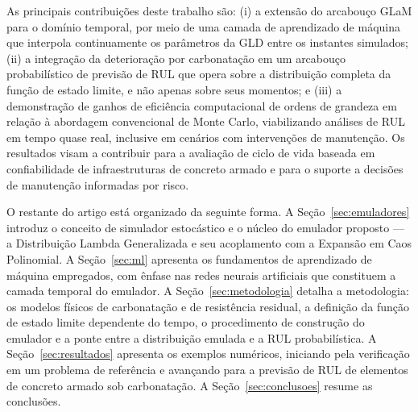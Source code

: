 As principais contribuições deste trabalho são: (i) a extensão do arcabouço GLaM para o domínio temporal, por meio de uma camada de aprendizado de máquina que interpola continuamente os parâmetros da GLD entre os instantes simulados; (ii) a integração da deterioração por carbonatação em um arcabouço probabilístico de previsão de RUL que opera sobre a distribuição completa da função de estado limite, e não apenas sobre seus momentos; e (iii) a demonstração de ganhos de eficiência computacional de ordens de grandeza em relação à abordagem convencional de Monte Carlo, viabilizando análises de RUL em tempo quase real, inclusive em cenários com intervenções de manutenção. Os resultados visam a contribuir para a avaliação de ciclo de vida baseada em confiabilidade de infraestruturas de concreto armado e para o suporte a decisões de manutenção informadas por risco.

O restante do artigo está organizado da seguinte forma. A Seção~\ref{sec:emuladores} introduz o conceito de simulador estocástico e o núcleo do emulador proposto --- a Distribuição Lambda Generalizada e seu acoplamento com a Expansão em Caos Polinomial. A Seção~\ref{sec:ml} apresenta os fundamentos de aprendizado de máquina empregados, com ênfase nas redes neurais artificiais que constituem a camada temporal do emulador. A Seção~\ref{sec:metodologia} detalha a metodologia: os modelos físicos de carbonatação e de resistência residual, a definição da função de estado limite dependente do tempo, o procedimento de construção do emulador e a ponte entre a distribuição emulada e a RUL probabilística. A Seção~\ref{sec:resultados} apresenta os exemplos numéricos, iniciando pela verificação em um problema de referência e avançando para a previsão de RUL de elementos de concreto armado sob carbonatação. A Seção~\ref{sec:conclusoes} resume as conclusões.
